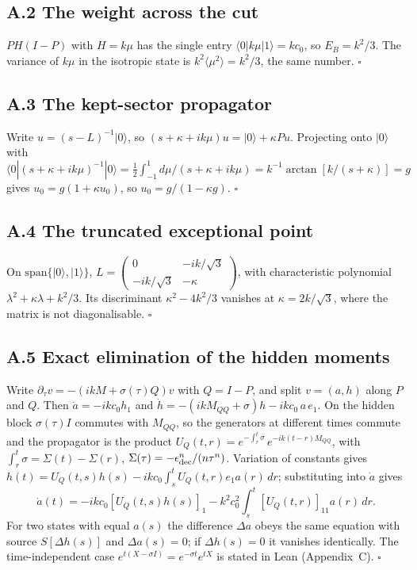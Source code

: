 \documentclass[11pt]{article}
\begin{document}
\subsection*{A.2 The weight across the cut}
$PH(I-P)$ with $H=k\mu$ has the single entry $\langle0|k\mu|1\rangle=kc_0$, so $E_B=k^2/3$. The variance of $k\mu$ in the isotropic state is $k^2\langle\mu^2\rangle=k^2/3$, the same number. $\square$
\subsection*{A.3 The kept-sector propagator}
Write $u=(s-L)^{-1}|0\rangle$, so $(s+\kappa+ik\mu)u=|0\rangle+\kappa Pu$. Projecting onto $|0\rangle$ with $\langle0|(s+\kappa+ik\mu)^{-1}|0\rangle=\tfrac12\int_{-1}^{1}d\mu/(s+\kappa+ik\mu)=k^{-1}\arctan[k/(s+\kappa)]=g$ gives $u_0=g(1+\kappa u_0)$, so $u_0=g/(1-\kappa g)$. $\square$
\subsection*{A.4 The truncated exceptional point}
On $\mathrm{span}\{|0\rangle,|1\rangle\}$, $L=\begin{pmatrix}0&-ik/\sqrt3\\-ik/\sqrt3&-\kappa\end{pmatrix}$, with characteristic polynomial $\lambda^2+\kappa\lambda+k^2/3$. Its discriminant $\kappa^2-4k^2/3$ vanishes at $\kappa=2k/\sqrt3$, where the matrix is not diagonalisable. $\square$

\subsection*{A.5 Exact elimination of the hidden moments}
Write $\partial_\tau v=-(ikM+\sigma(\tau)Q)v$ with $Q=I-P$, and split $v=(a,h)$ along $P$ and $Q$. Then $\dot a=-ikc_0h_1$ and $\dot h=-(ikM_{QQ}+\sigma)h-ikc_0\,a\,e_1$. On the hidden block $\sigma(\tau)I$ commutes with $M_{QQ}$, so the generators at different times commute and the propagator is the product $U_Q(t,r)=e^{-\int_r^t\sigma}\,e^{-ik(t-r)M_{QQ}}$, with $\int_r^t\sigma=\Sigma(t)-\Sigma(r)$, $\Sigma(\tau)=-\epsilon_{\rm dec}^n/(n\tau^n)$. Variation of constants gives $h(t)=U_Q(t,s)h(s)-ikc_0\int_s^tU_Q(t,r)e_1a(r)\,dr$; substituting into $\dot a$ gives
\[
\dot a(t)=-ikc_0[U_Q(t,s)h(s)]_1-k^2c_0^2\int_s^t[U_Q(t,r)]_{11}a(r)\,dr .
\]
For two states with equal $a(s)$ the difference $\Delta a$ obeys the same equation with source $S[\Delta h(s)]$ and $\Delta a(s)=0$; if $\Delta h(s)=0$ it vanishes identically. The time-independent case $e^{t(X-\sigma I)}=e^{-\sigma t}e^{tX}$ is stated in Lean (Appendix~C). $\square$
\end{document}
